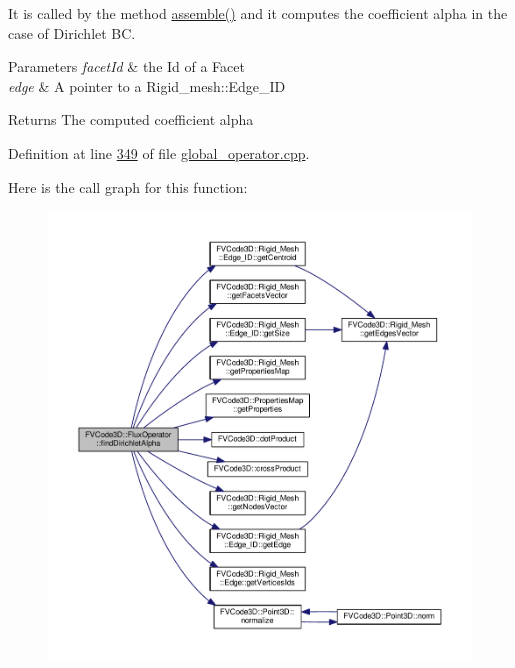 It is called by the method \hyperlink{classFVCode3D_1_1FluxOperator_a4f96ac53cafc68eccb01d8ff29eecc87}{assemble()} and it computes the coefficient alpha in the case of Dirichlet BC. 


\begin{DoxyParams}{Parameters}
{\em facet\+Id} & the Id of a Facet \\
\hline
{\em edge} & A pointer to a Rigid\+\_\+mesh\+::\+Edge\+\_\+\+ID \\
\hline
\end{DoxyParams}
\begin{DoxyReturn}{Returns}
The computed coefficient alpha 
\end{DoxyReturn}


Definition at line \hyperlink{global__operator_8cpp_source_l00349}{349} of file \hyperlink{global__operator_8cpp_source}{global\+\_\+operator.\+cpp}.



Here is the call graph for this function\+:
\nopagebreak
\begin{figure}[H]
\begin{center}
\leavevmode
\includegraphics[width=350pt]{classFVCode3D_1_1FluxOperator_a0fe812b8a650b83ef5815f4dee25e0cf_cgraph}
\end{center}
\end{figure}


